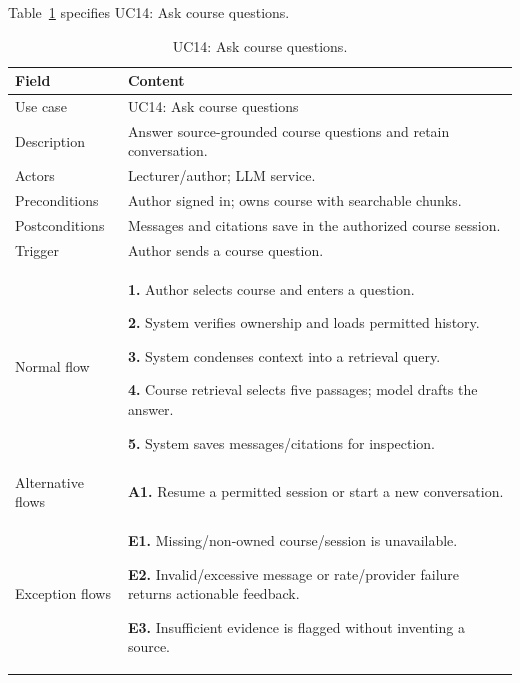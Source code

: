 \needspace{.39\textheight}
Table~\ref{tab:uc-14} specifies UC14: Ask course questions.
\begin{table}[H]\centering\footnotesize{}\renewcommand{\arraystretch}{1.05}
\caption{UC14: Ask course questions.}\label{tab:uc-14}
\begin{tabular}{|p{2.8cm}|p{11.9cm}|}\hline
\textbf{Field} & \textbf{Content}\\\hline
Use case & UC14: Ask course questions\\\hline
Description & Answer source-grounded course questions and retain conversation.\\\hline
Actors & Lecturer/author; LLM service.\\\hline
Preconditions & Author signed in; owns course with searchable chunks.\\\hline
Postconditions & Messages and citations save in the authorized course session.\\\hline
Trigger & Author sends a course question.\\\hline
Normal flow & \textbf{1.} Author selects course and enters a question.\par \textbf{2.} System verifies ownership and loads permitted history.\par \textbf{3.} System condenses context into a retrieval query.\par \textbf{4.} Course retrieval selects five passages; model drafts the answer.\par \textbf{5.} System saves messages/citations for inspection.\\\hline
Alternative flows & \textbf{A1.} Resume a permitted session or start a new conversation.\\\hline
Exception flows & \textbf{E1.} Missing/non-owned course/session is unavailable.\par \textbf{E2.} Invalid/excessive message or rate/provider failure returns actionable feedback.\par \textbf{E3.} Insufficient evidence is flagged without inventing a source.\\\hline
\end{tabular}\end{table}

